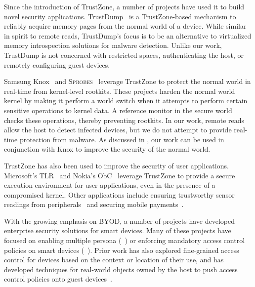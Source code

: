 \label{section:related}

%
Since the introduction of TrustZone, a number of projects have used it to build
novel security applications.  TrustDump~\cite{trustdump:esorics14} is a
TrustZone-based mechanism to reliably acquire memory pages from the normal
world of a device.  While similar in spirit to remote reads, TrustDump's focus
is to be an alternative to virtualized memory introspection solutions for
malware detection. Unlike our work, TrustDump is not concerned with restricted
spaces, authenticating the host, or remotely configuring guest devices.

Samsung Knox~\cite{knox:ccs14} and \textsc{Sprobes}~\cite{sprobes:most14}
leverage TrustZone to protect the normal world in real-time from kernel-level
rootkits. These projects harden the normal world kernel by making it perform a
world switch when it attempts to perform certain sensitive operations to kernel
data. A reference monitor in the secure world checks these operations, thereby
preventing rootkits. In our work, remote reads allow the host to detect
infected devices, but we do not attempt to provide real-time protection from
malware. As discussed in , our work can be used in
conjunction with Knox to improve the security of the normal world.

TrustZone has also been used to improve the security of user applications.
Microsoft's TLR~\cite{tlr:asplos14} and Nokia's ObC~\cite{obc:asiaccs09}
leverage TrustZone to provide a secure execution environment for user
applications, even in the presence of a compromised kernel. Other applications
include ensuring trustworthy sensor readings from
peripherals~\cite{tenor:mobisys12} and securing mobile payments~\cite{proxama}.

 With the growing emphasis on BYOD, a number
of projects have developed enterprise security solutions for smart devices.
Many of these projects have focused on enabling multiple persona
(\eg~\cite{asm:sec14,flaskdroid:sec13,cells:sosp11}) or enforcing mandatory
access control policies on smart devices
(\eg~\cite{deepdroid:ndss15,seandroid:ndss13,flaskdroid:sec13,asm:sec14}).
Prior work has also explored fine-grained access control for devices based on
the context or location of
their use, and has developed techniques for real-world objects owned by the
host to push access control policies onto guest devices~\cite{crepe:isc10,conucon:securecomm10,saint:acsac09,Covington2002,Damiani2007,conxsense:asiaccs14,worlddriven:ccs14,blindspot:2009,markit:upside14}.

